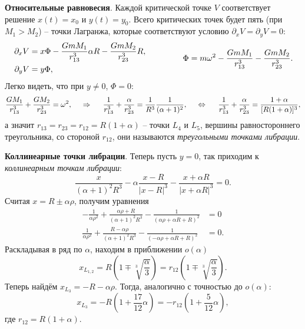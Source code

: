 \textbf{Относительные равновесия}. Каждой критической точке $V$ соответствует решение $x(t) = x_0$ и $y(t) = y_0$. Всего критических точек будет пять (при $M_1  > M_2$) -- точки Лагранжа, которые соответствуют условию $\partial_x V = \partial_y V = 0$:
\begin{equation*}
    \left.\begin{aligned}
    \partial_x V &= x \Phi -\frac{G m M_1}{r_{13}^3} \alpha R - \frac{G m M_2}{r_{23}^3} R, \\
    \partial_y V &= y \Phi,
    \end{aligned}\right.
    \hspace{15 mm} 
    \Phi = m  \omega^2 - \frac{G m M_1}{r_{13}^3}   - \frac{G m M_2}{r_{23}^3}.
\end{equation*}
Легко видеть, что при $y \neq 0$, $\Phi = 0$:
\begin{equation*}
    \frac{G M_1}{r_{13}^3} + \frac{G M_2}{r_{23}^3} = \omega^2,
    \hspace{0.5cm} \Rightarrow \hspace{0.5cm}
    \frac{1}{r_{13}^3} + \frac{\alpha}{r_{23}^3} = \frac{1}{R^3} \frac{1}{(\alpha + 1)^2},
    \hspace{5 mm} 
    \Leftrightarrow
    \hspace{5 mm} 
    \frac{1}{r_{13}^3} + \frac{\alpha}{r_{23}^3} = \frac{1 + \alpha}{[R(1 + \alpha)]^3},
\end{equation*}
а значит $r_{13} = r_{23} = r_{12} = R(1 + \alpha)$ -- точки $L_4$ и $L_5$, вершины равностороннего треугольника, со стороной $r_{12}$, они называются \textit{треугольными точками либрации}.

\textbf{Коллинеарные точки либрации}.
Теперь пусть $y=0$, так приходим к \textit{коллинеарным точкам либрации}:
\begin{equation*}
    \frac{x}{(\alpha+1)^2 R^3} - \alpha \frac{x-R}{|x-R|^3} - \frac{x + \alpha R}{|x + \alpha R|^3} = 0.
\end{equation*}
Считая $x = R \pm \alpha \rho$, получим уравнения
\begin{align*}
    -\frac{1}{\alpha  \rho ^2}+\frac{\alpha  \rho +R}{(\alpha +1)^2 R^3}-\frac{1}{(\alpha  \rho +\alpha  R+R)^2} &= 0 \\
    \frac{1}{\alpha  \rho ^2}+\frac{R-\alpha  \rho }{(\alpha +1)^2 R^3}-\frac{1}{(-\alpha  \rho +\alpha  R+R)^2} &= 0.
\end{align*}
Раскладывая в ряд по $\alpha$, находим в приближении $o(\alpha)$
\begin{equation*}
    x_{L_{1,2}} = R\left(1 \mp \sqrt[3]{\frac{\alpha}{3}} \right) = r_{12}\left(1 \mp \sqrt[3]{\frac{\alpha}{3}} \right).
\end{equation*}
Теперь найдём $x_{L_3} = -R - \alpha \rho$. Тогда, аналогично с точностью до $o(\alpha)$:
\begin{equation*}
    x_{L_3} = -R\left(1 + \frac{17}{12}\alpha\right) = - r_{12} \left(1 + \frac{5}{12} \alpha\right),
\end{equation*}
где $r_{12} = R(1 + \alpha)$.



